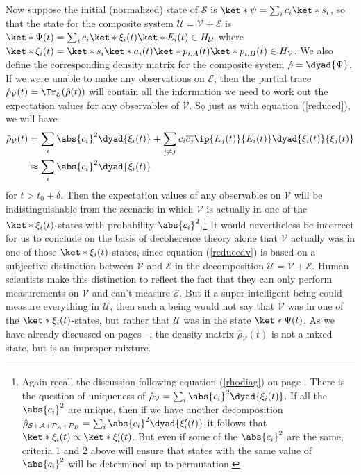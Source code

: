 \documentclass[12pt]{report}
\begin{document}
    Now suppose the initial (normalized) state of $\mathcal{S}$ is $\ket*{\psi}=\sum_i c_i\ket*{s_i}$, so that the state for the composite system $\mathcal{U}=\mathcal{V}+\mathcal{E}$ is $\ket*{\Psi(t)}=\sum_i c_i \ket*{\xi_i(t)}\ket*{E_i(t)}\in H_{\mathcal{U}}$ where $\ket*{\xi_i(t)}=\ket*{s_i}\ket*{a_i(t)}\ket*{p_{i,A}(t)}\ket*{p_{i,B}(t)}\in H_{\mathcal{V}}$. %
     We also define the corresponding density matrix for the composite system $\hat{\rho}=\dyad{\Psi}$. If we were unable to make any observations on $\mathcal{E}$, then 
     the partial trace
    $\hat{\rho}_{\mathcal{V}}(t)=\Tr_\mathcal{E}(\hat{\rho}(t))$ will contain all the information we need to work out the expectation values for any observables of  $\mathcal{V}.$ So just as with equation (\ref{reduced}), we will have
    \begin{equation} \label{reducedv}
    \begin{split}
      \hat{\rho}_{\mathcal{V}}(t)&=\sum_{i}\abs{c_i}^2\dyad{\xi_i(t)}+\sum_{i\neq j}c_i\overline{c_j}\ip{E_j(t)}{E_i(t)}\dyad{\xi_i(t)}{\xi_j(t)}\\
      &\approx \sum_{i}\abs{c_i}^2\dyad{\xi_i(t)}
      \end{split}\end{equation}
      for $t>t_0+\delta.$ Then the expectation values of any observables on $\mathcal{V}$ will be indistinguishable from the scenario in which $\mathcal{V}$ is actually in one of the $\ket*{\xi_i(t)}$-states with probability $\abs{c_i}^2$.\footnote{Again recall the discussion following equation (\ref{rhodiag}) on page \pageref{rhodiag}. There is the question of uniqueness of $\hat{\rho}_{\mathcal{V}}=\sum_{i}\abs{c_i}^2\dyad{\xi_i(t)}$. If all the $\abs{c_i}^2$ are unique, then if we have another decomposition $\hat{\rho}_{\mathcal{S}+\mathcal{A}+\mathcal{P}_A+\mathcal{P}_B}=\sum_{i}\abs{c_i}^2\dyad{\xi_i'(t)}$ it follows that $\ket*{\xi_i(t)}\propto\ket*{\xi_i'(t)}$. But even if some of the $\abs{c_i}^2$ are the same, criteria 1 and 2 above will ensure that states with the same  value of $\abs{c_i}^2$ will be determined up to permutation.} It would nevertheless be incorrect for us to conclude on the basis of decoherence theory alone that $\mathcal{V}$ actually was in one of those $\ket*{\xi_i(t)}$-states, since equation (\ref{reducedv}) is based on a subjective distinction between $\mathcal{V}$ and $\mathcal{E}$ in the decomposition $\mathcal{U}=\mathcal{V}+\mathcal{E}.$ Human scientists make this distinction to reflect the fact that they can only perform measurements on $\mathcal{V}$ and can't measure $\mathcal{E}$. But if a super-intelligent being could measure everything in  $\mathcal{U}$, then such a being would not say that $\mathcal{V}$ was in one of the  $\ket*{\xi_i(t)}$-states, but rather that $\mathcal{U}$ was in the state $\ket*{\Psi(t)}$. As we have already discussed on pages \pageref{subtle}--\pageref{subtleend}, the density matrix $ \hat{\rho}_{\mathcal{V}}(t)$ is not a mixed state, but is an improper mixture. 
    
\end{document}
